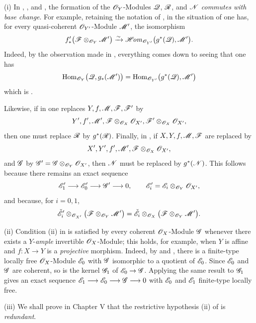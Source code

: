 \begin{remarks}[7.7.9]
\label{III.7.7.9}
\textnormal{(i)}
In , , and
, the formation of the $\mathscr{O}_Y$-Modules
$\mathscr{Q}$, $\mathscr{R}$, and $\mathscr{N}$ \emph{commutes with base change}.
For example, retaining the notation of , in
the situation of  one has, for every
quasi-coherent $\mathscr{O}_{Y'}$-Module $\mathscr{M}'$, the isomorphism
\[
  f'_*
  \bigl(\mathscr{F}\otimes_{\mathscr{O}_Y}\mathscr{M}'\bigr)
  \xrightarrow{\sim}
  \mathscr{H}\!\mathit{om}_{\mathscr{O}_{Y'}}
  \bigl(g^*(\mathscr{Q}),\mathscr{M}'\bigr).
\]
Indeed, by the observation made in , everything
comes down to seeing that one has
\[
  \operatorname{Hom}_{\mathscr{O}_Y}
  \bigl(\mathscr{Q},g_*(\mathscr{M}')\bigr)
  =
  \operatorname{Hom}_{\mathscr{O}_{Y'}}
  \bigl(g^*(\mathscr{Q}),\mathscr{M}'\bigr)
\]
which is .

Likewise, if in  one replaces
$Y,f,\mathscr{M},\mathscr{F},\mathscr{F}'$ by
\[
  Y',f',\mathscr{M}',
  \mathscr{F}\otimes_{\mathscr{O}_X}\mathscr{O}_{X'},
  \mathscr{F}'\otimes_{\mathscr{O}_X}\mathscr{O}_{X'},
\]
then one must replace $\mathscr{R}$ by $g^*(\mathscr{R})$.
Finally, in , if
$X,Y,f,\mathscr{M},\mathscr{F}$ are replaced by
\[
  X',Y',f',\mathscr{M}',
  \mathscr{F}\otimes_{\mathscr{O}_X}\mathscr{O}_{X'},
\]
and $\mathscr{G}$ by $\mathscr{G}'
=
\mathscr{G}\otimes_{\mathscr{O}_Y}\mathscr{O}_{X'}$,
then $\mathscr{N}$ must be replaced by $g^*(\mathscr{N})$.  This
follows because there remains an exact sequence
\[
  \mathscr{E}'_1\longrightarrow
  \mathscr{E}'_0\longrightarrow
  \mathscr{G}'\longrightarrow0,
  \qquad
  \mathscr{E}'_i
  =
  \mathscr{E}_i\otimes_{\mathscr{O}_Y}\mathscr{O}_{X'},
\]
and because, for $i=0,1$,
\[
  \check{\mathscr{E}}'_i
  \otimes_{\mathscr{O}_{X'}}
  \bigl(\mathscr{F}\otimes_{\mathscr{O}_Y}\mathscr{M}'\bigr)
  =
  \check{\mathscr{E}}_i
  \otimes_{\mathscr{O}_X}
  \bigl(\mathscr{F}\otimes_{\mathscr{O}_Y}\mathscr{M}'\bigr).
\]

\medskip
\textnormal{(ii)}
Condition (ii) in  is satisfied by every
coherent $\mathscr{O}_X$-Module $\mathscr{G}$ whenever there exists a
$Y$-\emph{ample} invertible $\mathscr{O}_X$-Module; this holds, for
example, when $Y$ is affine and $f:X\to Y$ is a \emph{projective}
morphism.
Indeed, by  and ,
there is a finite-type locally free $\mathscr{O}_X$-Module
$\mathscr{E}_0$ with $\mathscr{G}$ isomorphic to a quotient of
$\mathscr{E}_0$.  Since $\mathscr{E}_0$ and $\mathscr{G}$ are coherent, so
is the kernel $\mathscr{G}_1$ of $\mathscr{E}_0\to\mathscr{G}$.  Applying
the same result to $\mathscr{G}_1$ gives an exact sequence $\mathscr{E}_1\longrightarrow
\mathscr{E}_0\longrightarrow
\mathscr{G}\longrightarrow0$
with $\mathscr{E}_0$ and $\mathscr{E}_1$ finite-type locally free.

\medskip
\textnormal{(iii)}
We shall prove in Chapter V that the restrictive hypothesis
(ii) of  is \emph{redundant}.
\end{remarks}

